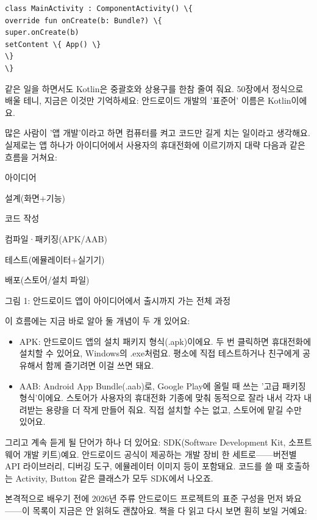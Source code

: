 \begin{lstlisting}
class MainActivity : ComponentActivity() \{
override fun onCreate(b: Bundle?) \{
super.onCreate(b)
setContent \{ App() \}
\}
\}
\end{lstlisting}

같은 일을 하면서도 Kotlin은 중괄호와 상용구를 한참 줄여 줘요. 50장에서 정식으로 배울 테니, 지금은 이것만 기억하세요: 안드로이드 개발의 '표준어' 이름은 Kotlin이에요.


많은 사람이 '앱 개발'이라고 하면 컴퓨터를 켜고 코드만 길게 치는 일이라고 생각해요. 실제로는 앱 하나가 아이디어에서 사용자의 휴대전화에 이르기까지 대략 다음과 같은 흐름을 거쳐요:

아이디어

설계(화면+기능)

코드 작성

컴파일·패키징(APK/AAB)

테스트(에뮬레이터+실기기)

배포(스토어/설치 파일)

\begin{center}\small\color{gray}그림 1: 안드로이드 앱이 아이디어에서 출시까지 가는 전체 과정\end{center}

이 흐름에는 지금 바로 알아 둘 개념이 두 개 있어요:

\begin{itemize}
  \item APK: 안드로이드 앱의 설치 패키지 형식(.apk)이에요. 두 번 클릭하면 휴대전화에 설치할 수 있어요, Windows의 .exe처럼요. 평소에 직접 테스트하거나 친구에게 공유해서 함께 즐기려면 이걸 쓰면 돼요.
  \item AAB: Android App Bundle(.aab)로, Google Play에 올릴 때 쓰는 '고급 패키징 형식'이에요. 스토어가 사용자의 휴대전화 기종에 맞춰 동적으로 잘라 내서 각자 내려받는 용량을 더 작게 만들어 줘요. 직접 설치할 수는 없고, 스토어에 맡길 수만 있어요.
\end{itemize}

그리고 계속 듣게 될 단어가 하나 더 있어요: SDK(Software Development Kit, 소프트웨어 개발 키트)예요. 안드로이드 공식이 제공하는 개발 장비 한 세트로——버전별 API 라이브러리, 디버깅 도구, 에뮬레이터 이미지 등이 포함돼요. 코드를 쓸 때 호출하는 Activity, Button 같은 클래스가 모두 SDK에서 나오죠.


본격적으로 배우기 전에 2026년 주류 안드로이드 프로젝트의 표준 구성을 먼저 봐요——이 목록이 지금은 안 읽혀도 괜찮아요. 책을 다 읽고 다시 보면 훤히 보일 거예요:

